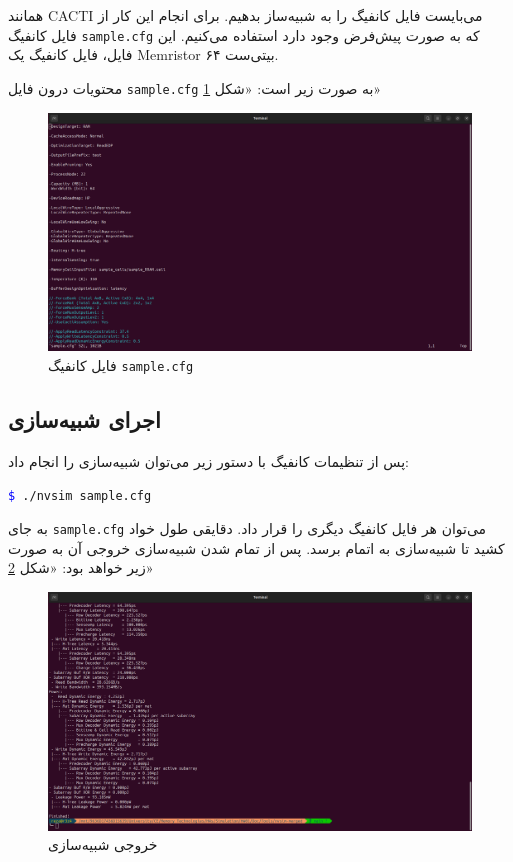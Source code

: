 \documentclass[12pt]{exam}
\begin{document}
\begin{questions}
همانند CACTI می‌بایست فایل کانفیگ را به شبیه‌ساز بدهیم. برای انجام این کار از فایل کانفیگ \texttt{sample.cfg} که به صورت پیش‌فرض وجود دارد استفاده می‌کنیم. این فایل، فایل کانفیگ یک Memristor ۶۴ بیتی‌ست.

محتویات درون فایل \texttt{sample.cfg} به صورت زیر است: «شکل \textcolor{blue}{\ref{فایل کانفیگ سمپل}}»

\begin{figure}[h]
	\centering
	\includegraphics[width=1\textwidth]{images/img7}
	\caption{فایل کانفیگ \texttt{sample.cfg}}
	\label{فایل کانفیگ سمپل}
\end{figure}


\subsection{اجرای شبیه‌سازی}
پس از تنظیمات کانفیگ با دستور زیر می‌توان شبیه‌سازی را انجام داد:
\begin{latin}
	\texttt{\textcolor{blue}{\$} ./nvsim sample.cfg} \\
\end{latin}

به جای \texttt{sample.cfg} می‌توان هر فایل کانفیگ دیگری را قرار داد. دقایقی طول خواد کشید تا شبیه‌سازی به اتمام برسد. پس از تمام شدن شبیه‌سازی خروجی آن به صورت زیر خواهد بود: «شکل \textcolor{blue}{\ref{خروجی شبیه‌سازی NVSIM}}»

\begin{figure}[h]
	\centering
	\includegraphics[width=1\textwidth]{images/img8}
	\caption{خروجی شبیه‌سازی}
	\label{خروجی شبیه‌سازی NVSIM}
\end{figure}


\end{questions}
\end{document}
